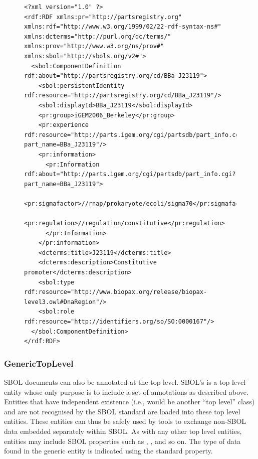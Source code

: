 \begin{figure} [ht]
\begin{lstlisting}
<?xml version="1.0" ?>
<rdf:RDF xmlns:pr="http://partsregistry.org" xmlns:rdf="http://www.w3.org/1999/02/22-rdf-syntax-ns#" xmlns:dcterms="http://purl.org/dc/terms/" xmlns:prov="http://www.w3.org/ns/prov#" xmlns:sbol="http://sbols.org/v2#">
  <sbol:ComponentDefinition rdf:about="http://partsregistry.org/cd/BBa_J23119">
    <sbol:persistentIdentity rdf:resource="http://partsregistry.org/cd/BBa_J23119"/>
    <sbol:displayId>BBa_J23119</sbol:displayId>
    <pr:group>iGEM2006_Berkeley</pr:group>
    <pr:experience rdf:resource="http://parts.igem.org/cgi/partsdb/part_info.cgi?part_name=BBa_J23119"/>
    <pr:information>
      <pr:Information rdf:about="http://parts.igem.org/cgi/partsdb/part_info.cgi?part_name=BBa_J23119">
        <pr:sigmafactor>//rnap/prokaryote/ecoli/sigma70</pr:sigmafactor>
        <pr:regulation>//regulation/constitutive</pr:regulation>
      </pr:Information>
    </pr:information>
    <dcterms:title>J23119</dcterms:title>
    <dcterms:description>Constitutive promoter</dcterms:description>
    <sbol:type rdf:resource="http://www.biopax.org/release/biopax-level3.owl#DnaRegion"/>
    <sbol:role rdf:resource="http://identifiers.org/so/SO:0000167"/>
  </sbol:ComponentDefinition>
</rdf:RDF>
\end{lstlisting}
\label{ser:Annotation}
\end{figure}




\subsubsection{GenericTopLevel}  
\label{sec:GenericTopLevel}
SBOL documents can also be annotated at the top level. 
SBOL's  is a top-level entity whose only purpose is to include a set of annotations as described above. 
Entities that have independent existence (i.e., would be another ``top level'' class) and are not recognised by the SBOL standard are loaded into these top level entities. 
These  entities can thus be safely used by tools to exchange non-SBOL data embedded separately within SBOL.
As with any other top level entities,  entities may include SBOL properties such as , ,  and so on. The type of data found in the generic entity is indicated using the standard  property.

